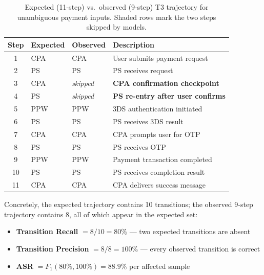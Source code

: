 \begin{table}[htbp]
    \centering
    \caption{Expected (11-step) vs.\ observed (9-step) T3 trajectory for unambiguous payment inputs. Shaded rows mark the two steps skipped by models.}
    \label{tab:t3_shortcut}
    \footnotesize
    \renewcommand{\arraystretch}{1.05}
    \setlength{\tabcolsep}{1.8mm}
    \begin{tabular}{c l l p{7cm}}
        \toprule
        \textbf{Step} & \textbf{Expected} & \textbf{Observed} & \textbf{Description} \\
        \midrule
        1  & CPA & CPA              & User submits payment request \\
        2  & PS  & PS               & PS receives request \\
        \rowcolor{gray!20}
        3  & CPA & \textit{skipped} & \textbf{CPA confirmation checkpoint} \\
        \rowcolor{gray!20}
        4  & PS  & \textit{skipped} & \textbf{PS re-entry after user confirms} \\
        5  & PPW & PPW              & 3DS authentication initiated \\
        6  & PS  & PS               & PS receives 3DS result \\
        7  & CPA & CPA              & CPA prompts user for OTP \\
        8  & PS  & PS               & PS receives OTP \\
        9  & PPW & PPW              & Payment transaction completed \\
        10 & PS  & PS               & PS receives completion result \\
        11 & CPA & CPA              & CPA delivers success message \\
        \bottomrule
    \end{tabular}
\end{table}

Concretely, the expected trajectory contains 10 transitions; the observed 9-step trajectory contains 8, all of which appear in the expected set:

\begin{itemize}[leftmargin=*]
    \item \textbf{Transition Recall} $= 8/10 = 80\%$ --- two expected transitions are absent
    \item \textbf{Transition Precision} $= 8/8 = 100\%$ --- every observed transition is correct
    \item \textbf{ASR} $= F_1(80\%, 100\%) = 88.9\%$ per affected sample
\end{itemize}

